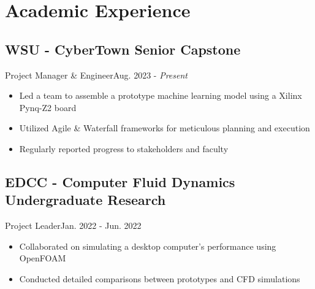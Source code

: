 \section{Academic Experience}
\subsection{WSU - CyberTown Senior Capstone}{Project Manager \& Engineer}{Aug. 2023 - \textit{Present}}
\begin{itemize}
    \item Led a team to assemble a prototype machine learning model using a Xilinx Pynq-Z2 board
    \item Utilized Agile \& Waterfall frameworks for meticulous planning and execution
    \item Regularly reported progress to stakeholders and faculty
\end{itemize}

\subsection{EDCC - Computer Fluid Dynamics Undergraduate Research}{Project Leader}{Jan. 2022 - Jun. 2022}
\begin{itemize}
    \item Collaborated on simulating a desktop computer's performance using OpenFOAM
    \item Conducted detailed comparisons between prototypes and CFD simulations
\end{itemize}

